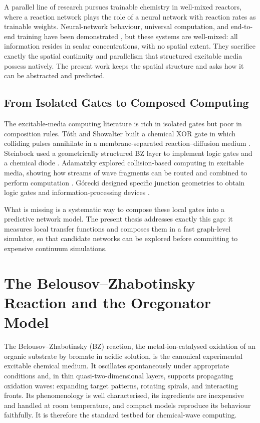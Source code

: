 A parallel line of research pursues trainable chemistry in well-mixed reactors, where a reaction network plays the role of a neural network with reaction rates as trainable weights.
Neural-network behaviour, universal computation, and end-to-end training have been demonstrated \cite{hjelmfelt1991chemical, magnasco1997chemical, dack2024rncrn, cherry2018scaling}, but these systems are well-mixed: all information resides in scalar concentrations, with no spatial extent.
They sacrifice exactly the spatial continuity and parallelism that structured excitable media possess natively.
The present work keeps the spatial structure and asks how it can be abstracted and predicted.

\subsection{From Isolated Gates to Composed Computing}
\label{subsec:lit_gates}

The excitable-media computing literature is rich in isolated gates but poor in composition rules.
T\'{o}th and Showalter built a chemical XOR gate in which colliding pulses annihilate in a membrane-separated reaction--diffusion medium \cite{toth1995logic}.
Steinbock \etal used a geometrically structured BZ layer to implement logic gates and a chemical diode \cite{steinbock1996chemical}.
Adamatzky explored collision-based computing in excitable media, showing how streams of wave fragments can be routed and combined to perform computation \cite{adamatzky2002collision, adamatzky2002xor}.
G\'{o}recki \etal designed specific junction geometries to obtain logic gates and information-processing devices \cite{gorecki2009information}.

What is missing is a systematic way to compose these local gates into a predictive network model.
The present thesis addresses exactly this gap: it measures local transfer functions and composes them in a fast graph-level simulator, so that candidate networks can be explored before committing to expensive continuum simulations.

\section{The Belousov--Zhabotinsky Reaction and the Oregonator Model}
\label{sec:lit_bz}

The Belousov--Zhabotinsky (BZ) reaction, the metal-ion-catalysed oxidation of an organic substrate by bromate in acidic solution, is the canonical experimental excitable chemical medium.
It oscillates spontaneously under appropriate conditions and, in thin quasi-two-dimensional layers, supports propagating oxidation waves: expanding target patterns, rotating spirals, and interacting fronts.
Its phenomenology is well characterised, its ingredients are inexpensive and handled at room temperature, and compact models reproduce its behaviour faithfully.
It is therefore the standard testbed for chemical-wave computing.

